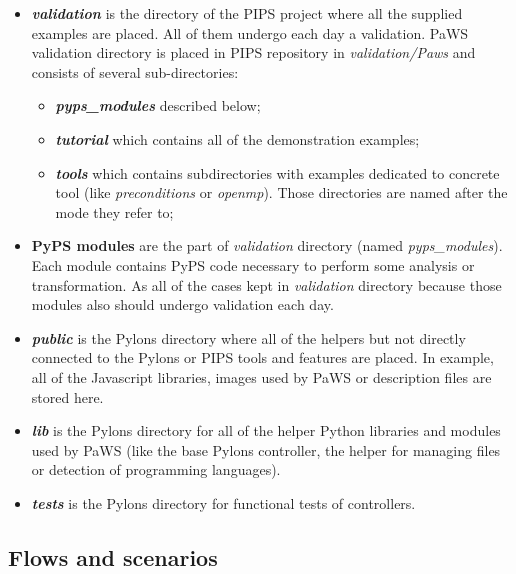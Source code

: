\begin{itemize}

\item {\bf \emph{validation}} is the directory of the PIPS project where
  all the supplied examples are placed. All of them
  undergo each day a validation. PaWS validation directory is placed in PIPS
  repository in \emph{validation/Paws} and consists of several
  sub-directories:

  \begin{itemize}

    \item {\bf \emph{pyps\_modules}} described below;

    \item {\bf \emph{tutorial}} which contains all of the demonstration examples;
    \item {\bf \emph{tools}} which contains subdirectories with
      examples dedicated to concrete tool (like \emph{preconditions}
      or \emph{openmp}). Those directories are named after the mode they
      refer to;

  \end{itemize}

\item {\bf PyPS modules} are the part of \emph{validation} directory
  (named \emph{pyps\_modules}). Each module contains PyPS code
  necessary to perform some analysis or transformation. As all of the
  cases kept in \emph{validation} directory because those modules also
  should undergo validation each day.

  \item {\bf \emph{public}} is the Pylons directory where all of the
    helpers but not directly connected to the Pylons or PIPS tools and
    features are placed. In example, all of the Javascript libraries,
    images used by PaWS or description files are stored here.

  \item {\bf \emph{lib}} is the Pylons directory for all of the helper
    Python libraries and modules used by PaWS (like the base Pylons
    controller, the helper for managing files or detection of programming
    languages).

  \item {\bf \emph{tests}} is the Pylons directory for functional
    tests of controllers.

\end{itemize}

\subsection{Flows and scenarios}

